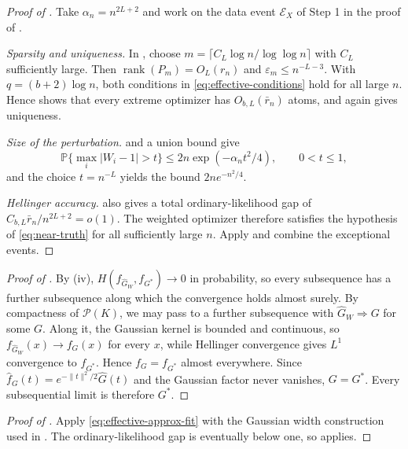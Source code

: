 \documentclass[11pt]{article}
\theoremstyle{definition}
\theoremstyle{remark}
\DeclareMathOperator{\rank}{rank}
\newcommand{\Pcal}{\mathcal P}
\newcommand{\PP}{\mathbb P}
\newcommand{\norm}[1]{\lVert #1\rVert}
\newcommand{\abs}[1]{\lvert #1\rvert}
\newcommand{\Ghat}{\widehat G}
\newcommand{\eps}{\varepsilon}
\begin{document}
\begin{proof}[Proof of ]
Take $\alpha_n=n^{2L+2}$ and work on the data event $\mathcal E_X$ of Step 1
in the proof of .

\emph{Sparsity and uniqueness.}  In , choose
$m=\lceil C_L\log n/\log\log n\rceil$ with $C_L$ sufficiently large.  Then
$\rank(P_m)=O_L(r_n)$ and $\eps_m\le n^{-L-3}$.  With $q=(b+2)\log n$, both
conditions in \eqref{eq:effective-conditions} hold for all large $n$.  Hence
 shows that every extreme optimizer has
$O_{b,L}(\bar r_n)$ atoms, and  again gives uniqueness.

\emph{Size of the perturbation.}   and a union
bound give
\[
 \PP\{\max_i\abs{W_i-1}>t\}\le2n\exp(-\alpha_nt^2/4),
 \qquad 0<t\le1,
\]
and the choice $t=n^{-L}$ yields the bound $2ne^{-n^2/4}$.

\emph{Hellinger accuracy.}   also gives a total
ordinary-likelihood gap of $C_{b,L}\bar r_n/n^{2L+2}=o(1)$.  The weighted
optimizer therefore satisfies the hypothesis of \eqref{eq:near-truth} for all
sufficiently large $n$.  Apply  and combine the
exceptional events.
\end{proof}

\begin{proof}[Proof of ]
By (iv), $H(f_{\Ghat_W},f_{G^*})\to0$ in probability, so
every subsequence has a further subsequence along which the convergence holds
almost surely.  By compactness of $\Pcal(K)$, we may pass to a further
subsequence with $\Ghat_W\Rightarrow G$ for some $G$.  Along it, the Gaussian
kernel is bounded and continuous, so $f_{\Ghat_W}(x)\to f_G(x)$ for every
$x$, while Hellinger convergence gives $L^1$ convergence to $f_{G^*}$.  Hence
$f_G=f_{G^*}$ almost everywhere.  Since
$\widehat f_G(t)=e^{-\norm{t}^2/2}\widehat G(t)$ and the Gaussian factor never
vanishes, $G=G^*$.  Every subsequential limit is therefore $G^*$.
\end{proof}

\begin{proof}[Proof of ]
Apply \eqref{eq:effective-approx-fit} with the Gaussian width construction
used in .  The ordinary-likelihood gap is eventually
below one, so  applies.
\end{proof}

\end{document}
